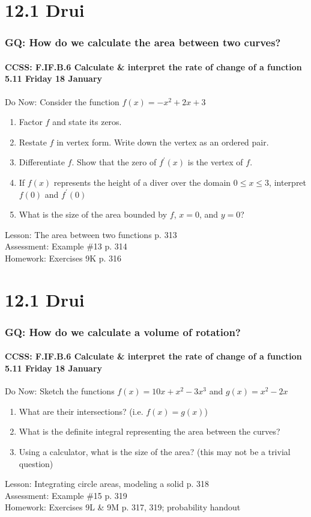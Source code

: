 \documentclass{beamer}
\begin{document}
  \section{12.1 Drui}
  \frame
  {
    \frametitle{GQ: How do we calculate the area between two curves?}
    \framesubtitle{CCSS: F.IF.B.6 Calculate \& interpret the rate of change of a function  \alert{5.11 Friday 18 January}}

    \begin{block}{Do Now: Consider the function $f(x)=-x^2+2x+3$}
    \begin{enumerate}
        \item Factor $f$ and state its zeros.
        \item Restate $f$ in vertex form. Write down the vertex as an ordered pair.
        \item Differentiate $f$. Show that the zero of $f^\prime(x)$ is the vertex of $f$.
        \item If $f(x)$ represents the height of a diver over the domain $0 \leq x \leq 3$, interpret $f(0)$ and $f^\prime(0)$
        \item What is the size of the area bounded by $f$, $x=0$, and $y=0$?
    \end{enumerate}
    \end{block}
    Lesson: The area between two functions p. 313\\%
    Assessment: Example \#13 p. 314 \\%
    Homework: Exercises 9K p. 316
  }

  \section{12.1 Drui}
  \frame
  {
    \frametitle{GQ: How do we calculate a volume of rotation?}
    \framesubtitle{CCSS: F.IF.B.6 Calculate \& interpret the rate of change of a function  \alert{5.11 Friday 18 January}}

    \begin{block}{Do Now: Sketch the functions $f(x)=10x+x^2-3x^3$ and $g(x)=x^2-2x$}
    \begin{enumerate}
        \item What are their intersections? (i.e. $f(x)=g(x)$)
        \item What is the definite integral representing the area between the curves?
        \item Using a calculator, what is the size of the area? (this may not be a trivial question)
    \end{enumerate}
    \end{block}
    Lesson: Integrating circle areas, modeling a solid p. 318\\%
    Assessment: Example \#15 p. 319 \\%
    Homework: Exercises 9L \& 9M p. 317, 319; probability handout
  }
\end{document}
